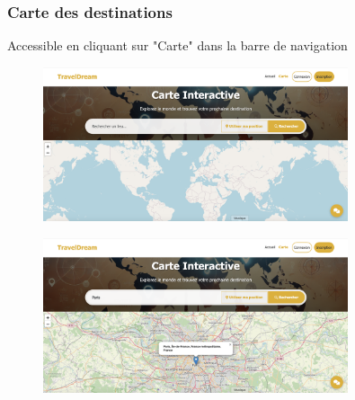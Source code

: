 \documentclass[a4paper,12pt]{article}
\begin{document}
\subsubsection{Carte des destinations}
Accessible en cliquant sur "Carte" dans la barre de navigation
\begin{figure}[H]
    \centering
    \includegraphics[width=0.8\textwidth]{5_carte_1.png}
\end{figure}
\begin{figure}[H]
    \centering
    \includegraphics[width=0.8\textwidth]{5_carte_2.png}
\end{figure}
\end{document}
